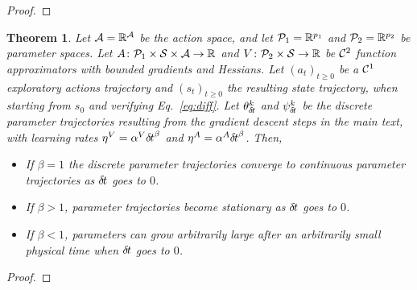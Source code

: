 \documentclass[11pt]{article}
\newtheorem{theorem}{Theorem}
\begin{document}
\begin{proof}
	
\end{proof}
\begin{theorem}
	Let $\cal A = \mathbb{R}^A$ be the action space, and let ${\cal P}_1 = \mathbb{R}^{p_1}$ and ${\cal P}_2 = \mathbb{R}^{p_2}$ be parameter spaces.  Let
	$A\colon {\cal P}_1 \times {\cal S} \times {\cal A} \rightarrow \mathbb{R}$
	and $V\colon {\cal P}_2 \times {\cal S} \rightarrow \mathbb{R}$ be ${\cal
	C}^2$ function approximators with bounded gradients and Hessians. Let
	$(a_t)_{t\geq 0}$ be a ${\cal C}^1$ exploratory actions trajectory and
	$(s_t)_{t\geq 0}$ the resulting state trajectory, when starting from $s_0$ and
	verifying Eq.~\eqref{eq:diff}.  Let $\theta^k_{\delta\hspace{-.1em}t}$ and
	$\psi^k_{\delta\hspace{-.1em}t}$ be the discrete parameter trajectories resulting from
	the gradient descent steps in the main text, with
	learning rates $\eta^V = \alpha^V {\delta\hspace{-.1em}t}^\beta$ and $\eta^A = \alpha^A {\delta\hspace{-.1em}t}^\beta$. Then,
	\begin{itemize}
		\item If $\beta = 1$ the discrete parameter trajectories converge to continuous parameter
			trajectories as ${\delta\hspace{-.1em}t}$ goes to $0$.
		\item If $\beta > 1$, parameter trajectories become
		stationary as
			${\delta\hspace{-.1em}t}$ goes to $0$.
		\item If $\beta < 1$, parameters can grow arbitrarily large after an arbitrarily small physical time when ${\delta\hspace{-.1em}t}$ goes to $0$.
	\end{itemize}
\end{theorem}
\begin{proof}
	
	
\end{proof}
\end{document}
